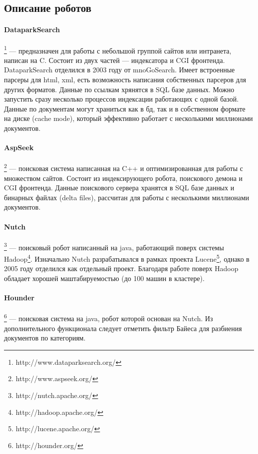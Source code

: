 \subsection{Описание роботов}
\paragraph{DataparkSearch}\footnote{http://www.dataparksearch.org/} --- предназначен для работы с небольшой группой сайтов или интранета, написан на C. Состоит из двух частей --- индексатора и CGI фронтенда. DataparkSearch отделился в 2003 году от mnoGoSearch. Имеет встроенные парсеры для html, xml, есть возможность написания собственных парсеров для других форматов. Данные по ссылкам хрянятся в SQL базе данных. Можно запустить сразу несколько процессов индексации работающих с одной базой. Данные по документам могут храниться как в бд, так и в собственном формате на диске (cache mode), который эффективно работает с несколькими миллионами документов.
\paragraph{AspSeek}\footnote{http://www.aspseek.org/} --- поисковая система написанная на C++ и оптимизированная для работы с множеством сайтов. Состоит из индексирующего робота, поискового демона и CGI фронтенда. Данные поискового сервера хранятся в SQL базе данных и бинарных файлах (delta files), рассчитан для работы с несколькими миллионами документов.
\paragraph{Nutch}\footnote{http://nutch.apache.org/} --- поисковый робот написанный на java, работающий поверх системы Hadoop\footnote{http://hadoop.apache.org/}. Изначально Nutch разрабатывался в рамках проекта Lucene\footnote{http://lucene.apache.org/}, однако в 2005 году отделился как отдельный проект. Благодаря работе поверх Hadoop обладает хорошей маштабируемостью (до 100 машин в кластере).
\paragraph{Hounder}\footnote{http://hounder.org/} --- поисковая система на java, робот которой основан на Nutch. Из дополнительного функционала следует отметить фильтр Байеса для разбиения документов по категориям.

